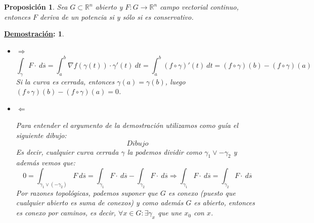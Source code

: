 \documentclass[10pt,a4paper,openright]{book}
\theoremstyle{break}
\newtheorem*{prop}{Proposición}
\newtheorem*{demo}{\underline{Demostración}:}
\newcommand{\dif}[1]{\ d#1}
\begin{document}
\begin{prop}
Sea $G \subset \mathbb{R}^n$ abierto y $F: G \rightarrow \mathbb{R}^n$ campo vectorial continuo, entonces $F$ deriva de un potencia si y sólo si es conservativo.
\end{prop}
\begin{demo}
\begin{itemize}
\item $\Rightarrow$
$$\int_{\gamma} F\cdot \dif{\overline{s}} = \int_{a}^{b} \nabla f\left( \gamma\left( t \right) \right) \cdot \gamma'\left( t \right) \dif{t} = \int_{a}^{b} \left( f \circ \gamma \right)'\left( t \right) \dif{t} = \left( f \circ \gamma \right)\left( b \right) - \left( f \circ \gamma \right) \left( a \right)$$
Si la curva es cerrada, entonces $\gamma(a) = \gamma(b)$, luego $\left( f \circ \gamma \right)\left( b \right) - \left( f \circ \gamma \right) \left( a \right) = 0$.

\item $\Leftarrow$

Para entender el argumento de la demostración utilizamos como guía el siguiente dibujo:
$$Dibujo$$
Es decir, cualquier curva cerrada $\gamma$ la podemos dividir como $\gamma_1 \vee -\gamma_2$ y además vemos que:
$$0 = \int_{\gamma_1 \lor \left( -\gamma_2 \right)} F \dif{\overline{s}} = \int_{\gamma_1} F \cdot \dif{\overline{s}} - \int_{\gamma_2} F \cdot \dif{\overline{s}} \Rightarrow \int_{\gamma_1} F \cdot \dif{\overline{s}} = \int_{\gamma_2} F \cdot \dif{\overline{s}}$$
Por razones topológicas, podemos suponer que $G$ es conexo (puesto que cualquier abierto es suma de conexos) y como además $G$ es abierto, entonces es conexo por caminos, es decir, $\forall x \in G: \exists \gamma_x$ que une $x_0$ con $x$.


\end{itemize}
\end{demo}
\end{document}
